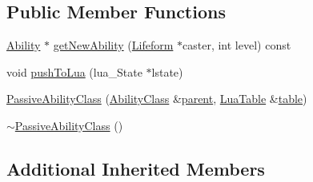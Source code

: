 \subsection*{Public Member Functions}
\begin{DoxyCompactItemize}
\item 
\hyperlink{classZeta_1_1Ability}{Ability} $\ast$ \hyperlink{classZeta_1_1PassiveAbilityClass_a33fb90d8a7f5855ebcac5be5d8e04c46}{get\+New\+Ability} (\hyperlink{classZeta_1_1Lifeform}{Lifeform} $\ast$caster, int level) const 
\item 
void \hyperlink{classZeta_1_1PassiveAbilityClass_a2f77c91b9f09a9aebe7648de40d6d928}{push\+To\+Lua} (lua\+\_\+\+State $\ast$lstate)
\item 
\hyperlink{classZeta_1_1PassiveAbilityClass_ab644860071ead1f76514ae84055d073a}{Passive\+Ability\+Class} (\hyperlink{classZeta_1_1AbilityClass}{Ability\+Class} \&\hyperlink{classZeta_1_1AbilityClass_ad862e9ba14d23afb20786a1eeb2ca872}{parent}, \hyperlink{classZeta_1_1LuaTable}{Lua\+Table} \&\hyperlink{classZeta_1_1AbilityClass_a58065ca9d19ff9366c09bfc8d81abbac}{table})
\item 
\hyperlink{classZeta_1_1PassiveAbilityClass_a5383655a4c365769019b76ecaaee4162}{$\sim$\+Passive\+Ability\+Class} ()
\end{DoxyCompactItemize}
\subsection*{Additional Inherited Members}


